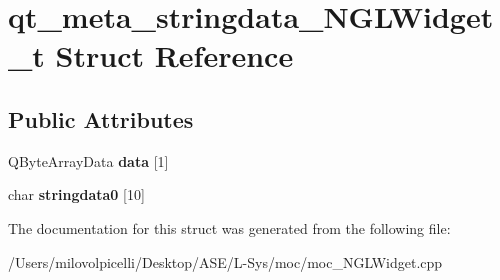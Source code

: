 \hypertarget{structqt__meta__stringdata___n_g_l_widget__t}{}\section{qt\+\_\+meta\+\_\+stringdata\+\_\+\+N\+G\+L\+Widget\+\_\+t Struct Reference}
\label{structqt__meta__stringdata___n_g_l_widget__t}
\subsection*{Public Attributes}
\begin{DoxyCompactItemize}
\item 
\mbox{\label{structqt__meta__stringdata___n_g_l_widget__t_a3b56c44f745a39072f4ee4fd17a9937c}} 
Q\+Byte\+Array\+Data {\bfseries data} \mbox{[}1\mbox{]}
\item 
\mbox{\label{structqt__meta__stringdata___n_g_l_widget__t_a0f589882776e1eca1acfeb65fc01c23c}} 
char {\bfseries stringdata0} \mbox{[}10\mbox{]}
\end{DoxyCompactItemize}


The documentation for this struct was generated from the following file\+:\begin{DoxyCompactItemize}
\item 
/\+Users/milovolpicelli/\+Desktop/\+A\+S\+E/\+L-\/\+Sys/moc/moc\+\_\+\+N\+G\+L\+Widget.\+cpp\end{DoxyCompactItemize}
